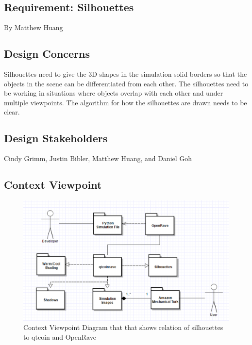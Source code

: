 \documentclass[10pt,journal,compsoc,draftclsnofoot]{IEEEtran}
\begin{document}
\begin{flushleft}
\newpage

\section{Requirement: Silhouettes}
\large{By Matthew Huang}

\normalsize
\subsection{Design Concerns}
Silhouettes need to give the 3D shapes in the simulation solid borders so that the objects in the scene can be differentiated from each other.
The silhouettes need to be working in situations where objects overlap with each other and under multiple viewpoints. 
The algorithm for how the silhouettes are drawn needs to be clear.

\subsection{Design Stakeholders}
Cindy Grimm, Justin Bibler, Matthew Huang, and Daniel Goh

\subsection{Context Viewpoint}

\begin{figure} [H]
  \includegraphics[scale=0.8]{Silhouettes_context.eps}
  \caption
{ \newline \hspace{\linewidth}
Context Viewpoint Diagram that that shows relation of silhouettes to qtcoin and OpenRave}
  \label{fig:Silhouettes_context}
\end{figure}


\end{flushleft}
\end{document}
